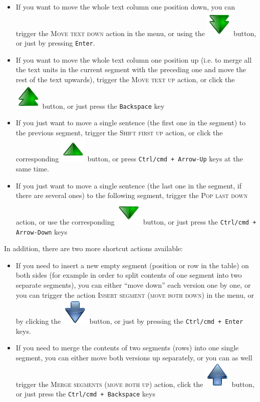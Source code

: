 \documentclass[a4paper,10pt,oneside]{book}
\newcommand{\keys}[1]{\texttt{#1}}
\newcommand{\menu}[1]{\textsc{#1}}
\begin{document}
\begin{itemize}
 \item If you want to move the whole text column one position down, you can trigger the \menu{Move text down} action in the menu, or using the \includegraphics[height=2ex]{../images/48/arrow-down-double.png} button, or just by pressing \keys{Enter}.
 \item If you want to move the whole text column one position up (i.e. to merge all the text units in the current segment with the preceding one and move the rest of the text upwards), trigger the \menu{Move text up} action, or click the \includegraphics[height=2ex]{../images/48/arrow-up-double.png} button, or just press the \keys{Backspace} key
 \item If you just want to move a single sentence (the first one in the segment) to the previous segment, trigger the \menu{Shift first up} action, or click the corresponding \includegraphics[height=2ex]{../images/48/arrow-up.png} button, or press \keys{Ctrl/cmd + Arrow-Up} keys at the same time.
 \item If you just want to move a single sentence (the last one in the segment, if there are several ones) to the following segment, trigger the \menu{Pop last down} action, or use the corresponding \includegraphics[height=2ex]{../images/48/arrow-down.png} button, or just press the \keys{Ctrl/cmd + Arrow-Down} keys
\end{itemize}

In addition, there are two more shortcut actions available:

\begin{itemize}
 \item If you need to insert a new empty segment (position or row in the table) on both sides (for example in order to split contents of one segment into two separate segments), you can either ``move down'' each version one by one, or you can trigger the action \menu{Insert segment (move both down)} in the menu, or by clicking the \includegraphics[height=2ex]{../images/48/go-down.png} button, or just by pressing the \keys{Ctrl/cmd + Enter} keys.
 \item If you need to merge the contents of two segments (rows) into one single segment, you can either move both versions up separately, or you can as well trigger the \menu{Merge segments (move both up)} action, click the \includegraphics[height=2ex]{../images/48/go-up.png} button, or just press the \keys{Ctrl/cmd + Backspace} keys
\end{itemize}
\end{document}
